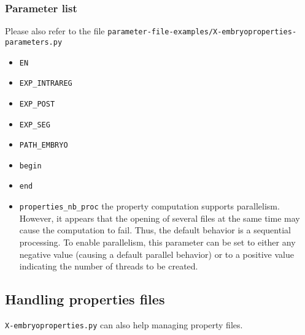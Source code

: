 \subsubsection{Parameter list}

Please also refer to the file
\texttt{parameter-file-examples/X-embryoproperties-parameters.py}

\begin{itemize}
\itemsep -1ex
\item \texttt{EN}
\item \texttt{EXP\_INTRAREG}
\item \texttt{EXP\_POST}
\item \texttt{EXP\_SEG}
\item \texttt{PATH\_EMBRYO}
\item \texttt{begin}
\item \texttt{end}
\item \texttt{properties\_nb\_proc} the property computation supports parallelism. However, it appears that the opening of several files at the same time may cause the computation to fail. Thus, the default behavior is a sequential processing. To enable parallelism, this parameter can be set to either any negative value (causing a default parallel behavior) or to a positive value indicating the number of threads to be created.
\end{itemize}

\subsection{Handling properties files}

\texttt{X-embryoproperties.py} can also help managing property files.

